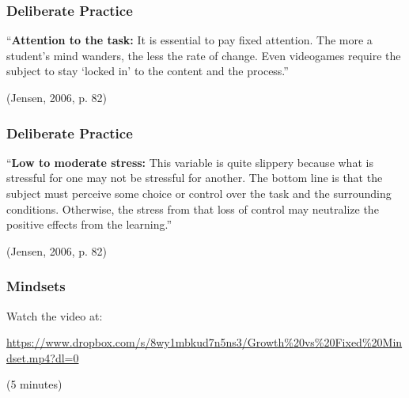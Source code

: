 
\begin{frame}
	\frametitle{Deliberate Practice}
	
	``\textbf{Attention to the task:} It is essential to pay fixed attention. The more a student's
	mind wanders, the less the rate of change. Even videogames require the subject to stay
	`locked in' to the content and the process.''
	
	 (Jensen, 2006, p. 82) 
	
\end{frame}

\begin{frame}
	\frametitle{Deliberate Practice}
	
	``\textbf{Low to moderate stress:} This variable is quite slippery because what is stressful
	for one may not be stressful for another. The bottom line is that the subject must perceive
	some choice or control over the task and the surrounding conditions. Otherwise, the stress 
	from that loss of control may neutralize the positive effects from the learning.''
	
	 (Jensen, 2006, p. 82) 
	
\end{frame}






\begin{frame}
	\frametitle{Mindsets}
	
	Watch the video at:
	
	\vspace{1.5em}
		
	\url{https://www.dropbox.com/s/8wy1mbkud7n5ns3/Growth\%20vs\%20Fixed\%20Mindset.mp4?dl=0}
	
	\vspace{1em}
		
	(5 minutes)
	
\end{frame}


